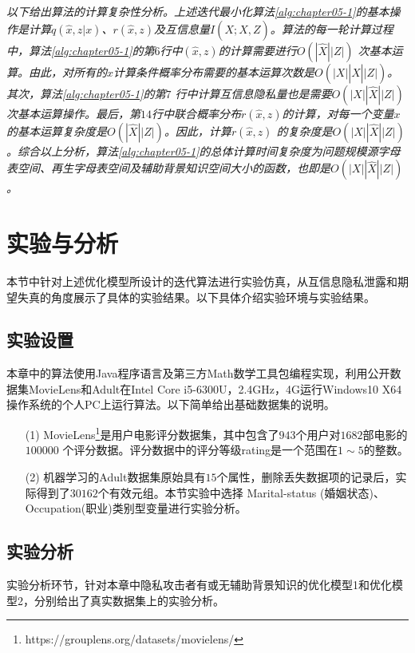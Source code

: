 \begin{remark}
	{\em 以下给出算法的计算复杂性分析。上述迭代最小化算法\textup{\ref{alg:chapter05-1}}的基本操作是计算$q(\hat{x},z|x)$、$r(\hat{x},z)$及互信息量$I(X;\hat{X},Z)$。算法的每一轮计算过程中，算法\textup{\ref{alg:chapter05-1}}的第$6$行中$(\hat{x},z)$的计算需要进行$O\left(|\hat{X}||Z|\right)$ 次基本运算。由此，对所有的$x$计算条件概率分布需要的基本运算次数是$O\left(|X||\hat{X}||Z|\right)$。其次，算法\textup{\ref{alg:chapter05-1}}的第$7$ 行中计算互信息隐私量也是需要$O\left(|X||\hat{X}||Z|\right)$次基本运算操作。最后，第$14$行中联合概率分布$r(\hat{x},z)$的计算，对每一个变量$x$的基本运算复杂度是$O\left(|\hat{X}||Z|\right)$。因此，计算$r(\hat{x},z)$ 的复杂度是$O\left(|X||\hat{X}||Z|\right)$。综合以上分析，算法\textup{\ref{alg:chapter05-1}}的总体计算时间复杂度为问题规模源字母表空间、再生字母表空间及辅助背景知识空间大小的函数，也即是$O\left(|X||\hat{X}||Z|\right)$。}
\end{remark}
\section{实验与分析}\label{chapter04-experiment}
本节中针对上述优化模型所设计的迭代算法进行实验仿真，从互信息隐私泄露和期望失真的角度展示了具体的实验结果。以下具体介绍实验环境与实验结果。
\subsection{实验设置}
本章中的算法使用Java程序语言及第三方Math数学工具包编程实现，利用公开数据集MovieLens和Adult在Intel Core i5-6300U，2.4GHz，4G运行Windows10 X64 操作系统的个人PC上运行算法。以下简单给出基础数据集的说明。
\begin{itemize}
\item [(1)]MovieLens\footnote{https://grouplens.org/datasets/movielens/}是用户电影评分数据集，其中包含了$943$个用户对$1682$部电影的$100000$ 个评分数据。评分数据中的评分等级rating是一个范围在$1 \sim 5$的整数。

\item [(2)]机器学习的Adult数据集原始具有$15$个属性，删除丢失数据项的记录后，实际得到了$30162$个有效元组。本节实验中选择 Marital-status (婚姻状态)、Occupation(职业)类别型变量进行实验分析。
\end{itemize}
\subsection{实验分析}

实验分析环节，针对本章中隐私攻击者有或无辅助背景知识的优化模型1和优化模型2，分别给出了真实数据集上的实验分析。

